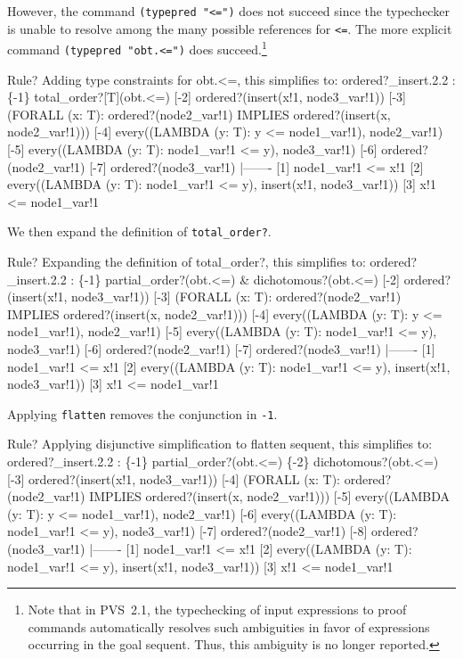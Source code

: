 \documentclass[11pt,twoside]{book}
\begin{document}
However, the command \texttt{(typepred "<=")} does
not succeed since the typechecker is unable to resolve among
the many possible references  for \texttt{<=}.  
The more explicit
command \texttt{(typepred "obt.<=")} does succeed.\footnote{Note
that in PVS~2.1, the typechecking of input expressions to proof commands
automatically resolves such ambiguities in favor of expressions occurring
in the goal sequent.  Thus, this ambiguity is no longer reported.}
\begin{session*}\label{2.2.proof.2}
Rule? 
Adding type constraints for  obt.<=,
this simplifies to: 
ordered?_insert.2.2 :  
\{-1\}   total_order?[T](obt.<=)
[-2]   ordered?(insert(x!1, node3_var!1))
[-3]   (FORALL (x: T):
         ordered?(node2_var!1) IMPLIES ordered?(insert(x, node2_var!1)))
[-4]   every((LAMBDA (y: T): y <= node1_var!1), node2_var!1)
[-5]   every((LAMBDA (y: T): node1_var!1 <= y), node3_var!1)
[-6]   ordered?(node2_var!1)
[-7]   ordered?(node3_var!1)
  |-------
[1]   node1_var!1 <= x!1
[2]   every((LAMBDA (y: T): node1_var!1 <= y), insert(x!1, node3_var!1))
[3]   x!1 <= node1_var!1
\end{session*}
We then expand  the definition of \texttt{total\_order?}.
\begin{session*}
Rule? 
Expanding the definition of total_order?,
this simplifies to: 
ordered?_insert.2.2 :  
\{-1\}   partial_order?(obt.<=) & dichotomous?(obt.<=)
[-2]   ordered?(insert(x!1, node3_var!1))
[-3]   (FORALL (x: T):
         ordered?(node2_var!1) IMPLIES ordered?(insert(x, node2_var!1)))
[-4]   every((LAMBDA (y: T): y <= node1_var!1), node2_var!1)
[-5]   every((LAMBDA (y: T): node1_var!1 <= y), node3_var!1)
[-6]   ordered?(node2_var!1)
[-7]   ordered?(node3_var!1)
  |-------
[1]   node1_var!1 <= x!1
[2]   every((LAMBDA (y: T): node1_var!1 <= y), insert(x!1, node3_var!1))
[3]   x!1 <= node1_var!1
\end{session*}
Applying \texttt{flatten} removes the conjunction in \texttt{-1}\@.
\begin{session*}
Rule? 
Applying disjunctive simplification to flatten sequent,
this simplifies to: 
ordered?_insert.2.2 :  
\{-1\}   partial_order?(obt.<=)
\{-2\}   dichotomous?(obt.<=)
[-3]   ordered?(insert(x!1, node3_var!1))
[-4]   (FORALL (x: T):
         ordered?(node2_var!1) IMPLIES ordered?(insert(x, node2_var!1)))
[-5]   every((LAMBDA (y: T): y <= node1_var!1), node2_var!1)
[-6]   every((LAMBDA (y: T): node1_var!1 <= y), node3_var!1)
[-7]   ordered?(node2_var!1)
[-8]   ordered?(node3_var!1)
  |-------
[1]   node1_var!1 <= x!1
[2]   every((LAMBDA (y: T): node1_var!1 <= y), insert(x!1, node3_var!1))
[3]   x!1 <= node1_var!1
\end{session*}
\end{document}
